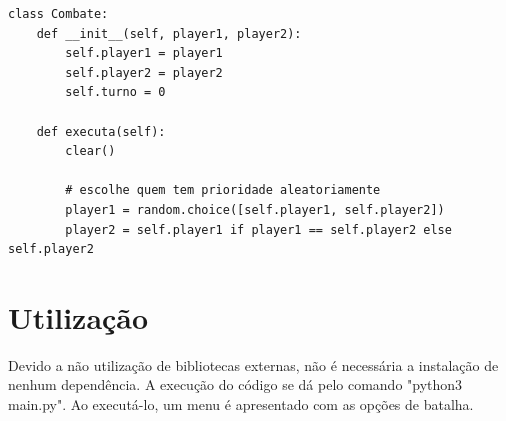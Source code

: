 \documentclass[12pt]{article}
\begin{document}
\begin{verbatim}
class Combate:
    def __init__(self, player1, player2):
        self.player1 = player1
        self.player2 = player2
        self.turno = 0

    def executa(self):
        clear()

        # escolhe quem tem prioridade aleatoriamente
        player1 = random.choice([self.player1, self.player2])
        player2 = self.player1 if player1 == self.player2 else self.player2
\end{verbatim}

\section{Utilização}
Devido a não utilização de bibliotecas externas, não é necessária a instalação de nenhum dependência. A execução do código se dá pelo comando "python3 main.py". Ao executá-lo, um menu é apresentado com as opções de batalha.
\end{document}
